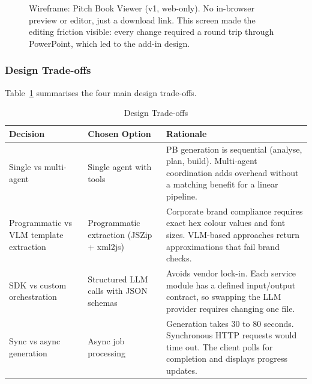 \begin{figure}[H]
{%
}
\caption{Wireframe: Pitch Book Viewer (v1, web-only). No in-browser preview or editor, just a download link. This screen made the editing friction visible: every change required a round trip through PowerPoint, which led to the add-in design.}
\label{fig:wf-viewer-v1}
\end{figure}

\subsubsection{Design Trade-offs}

Table~\ref{tab:tradeoffs} summarises the four main design trade-offs.

\begin{table}[H]
\centering
\begin{tabular}{|p{3.5cm}|p{4.0cm}|p{5.5cm}|}
\hline
\rowcolor{gray!20} \textbf{Decision} & \textbf{Chosen Option} & \textbf{Rationale} \\
\hline
Single vs multi-agent & Single agent with tools & PB generation is sequential (analyse, plan, build). Multi-agent coordination adds overhead without a matching benefit for a linear pipeline. \\
\hline
Programmatic vs VLM template extraction & Programmatic extraction (JSZip + xml2js) & Corporate brand compliance requires exact hex colour values and font sizes. VLM-based approaches return approximations that fail brand checks. \\
\hline
SDK vs custom orchestration & Structured LLM calls with JSON schemas & Avoids vendor lock-in. Each service module has a defined input/output contract, so swapping the LLM provider requires changing one file. \\
\hline
Sync vs async generation & Async job processing & Generation takes 30 to 80 seconds. Synchronous HTTP requests would time out. The client polls for completion and displays progress updates. \\
\hline
\end{tabular}
\caption{Design Trade-offs}
\label{tab:tradeoffs}
\end{table}

